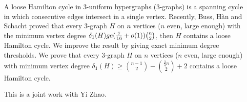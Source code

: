 \endtitle
A loose Hamilton cycle in 3-uniform hypergraphs (3-graphs) is a spanning cycle in which consecutive edges intersect in a single vertex. Recently, Buss, H\`an and Schacht proved that every 3-graph $H$ on $n$ vertices ($n$ even, large enough) with the minimum vertex degree $\delta_1(H) \\ge (\frac 7{16}+o(1))\binom n2$, then $H$ contains a loose Hamilton cycle. We improve the result by giving exact minimum degree thresholds. We prove that every 3-graph $H$ on $n$ vertices ($n$ even, large enough) with minimum vertex degree $\delta_1(H)\ge \binom{n-1}2 - \binom{\frac34 n}2 + 2$ contains a loose Hamilton cycle.

This is a joint work with Yi Zhao.